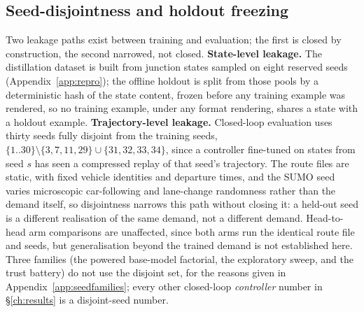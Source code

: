 \subsection{Seed-disjointness and holdout freezing}\label{sec:met-disjoint}
Two leakage paths exist between training and evaluation; the first is
closed by construction, the second narrowed, not closed.
\textbf{State-level leakage.} The distillation dataset is built from
junction states sampled on eight reserved seeds (Appendix~\ref{app:repro});
the offline holdout is split from those pools by a deterministic hash of
the state content, frozen before any training example was rendered, so no
training example, under any format rendering, shares a state with a
holdout example. \textbf{Trajectory-level leakage.} Closed-loop evaluation
uses thirty seeds fully disjoint from the training seeds,
$\{1..30\}\setminus\{3,7,11,29\}\cup\{31,32,33,34\}$, since a controller
fine-tuned on states from seed $s$ has seen a compressed replay of that
seed's trajectory. The route files are static, with fixed vehicle
identities and departure times, and the SUMO seed varies microscopic
car-following and lane-change randomness rather than the demand itself, so
disjointness narrows this path without closing it: a held-out seed is a
different realisation of the same demand, not a different demand.
Head-to-head arm comparisons are unaffected, since both arms run the
identical route file and seeds, but generalisation beyond the trained
demand is not established here. Three families (the powered base-model
factorial, the exploratory sweep, and the trust battery) do not use the
disjoint set, for the reasons given in Appendix~\ref{app:seedfamilies};
every other closed-loop \emph{controller} number in \S\ref{ch:results} is
a disjoint-seed number.
